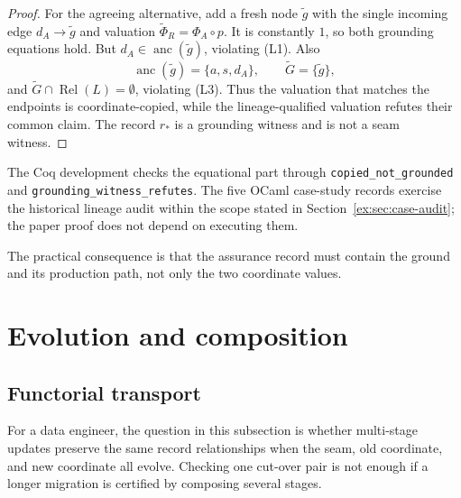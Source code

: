 \documentclass[11pt]{article}
\theoremstyle{definition}
\newcommand{\code}[1]{\texttt{#1}}
\begin{document}
\begin{proof}
For the agreeing alternative, add a fresh node $\widetilde g$ with the single incoming edge $d_A\to\widetilde g$ and valuation $\widetilde\Phi_R=\Phi_A\circ p$. It is constantly $1$, so both grounding equations hold. But $d_A\in\operatorname{anc}(\widetilde g)$, violating (L1). Also
\[
\operatorname{anc}(\widetilde g)=\{a,s,d_A\},
\qquad \widetilde G=\{\widetilde g\},
\]
and $\widetilde G\cap\operatorname{Rel}(L)=\emptyset$, violating (L3). Thus the valuation that matches the endpoints is coordinate-copied, while the lineage-qualified valuation refutes their common claim. The record $r_*$ is a grounding witness and is not a seam witness.
\end{proof}

The Coq development checks the equational part through \code{copied\_\allowbreak not\_\allowbreak grounded} and \code{grounding\_\allowbreak witness\_\allowbreak refutes}. The five OCaml case-study records exercise the historical lineage audit within the scope stated in Section~\ref{ex:sec:case-audit}; the paper proof does not depend on executing them.

The practical consequence is that the assurance record must contain the ground and its production path, not only the two coordinate values.

\section{Evolution and composition}\label{ex:sec:evolution}

\subsection{Functorial transport}\label{ex:sec:functorial-transport}

For a data engineer, the question in this subsection is whether multi-stage updates preserve the same record relationships when the seam, old coordinate, and new coordinate all evolve. Checking one cut-over pair is not enough if a longer migration is certified by composing several stages.
\end{document}
